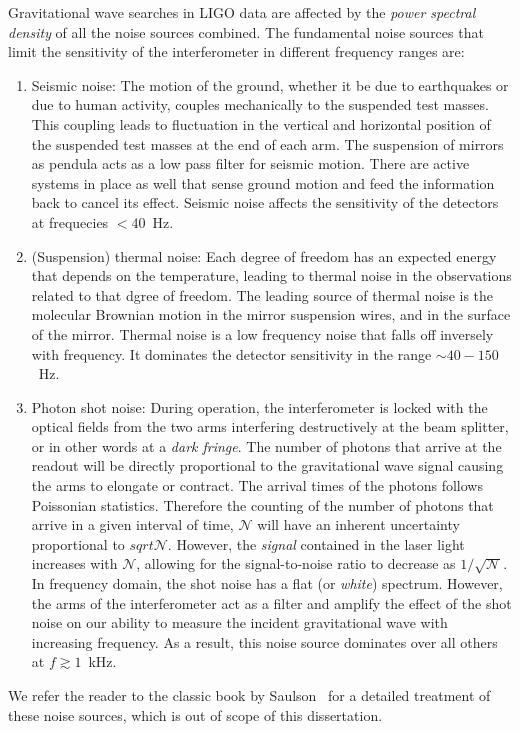 Gravitational wave searches in LIGO data are affected by the {\it power
spectral density} of all the noise sources combined. The fundamental noise 
sources that limit the sensitivity of the interferometer in different frequency
ranges are:
% 
\begin{enumerate}
 \item Seismic noise:
 The motion of the ground, whether it be due to earthquakes or due to human 
 activity, couples mechanically to the suspended test masses. This coupling
 leads to fluctuation in the vertical and horizontal position of the suspended
 test masses at the end of each arm. The suspension of mirrors as pendula acts 
 as a low pass filter for seismic motion. There are active systems in place as
 well that sense ground motion and feed the information back to cancel its
 effect. Seismic noise affects the sensitivity of the detectors at frequecies
 $< 40$~Hz.
 \item (Suspension) thermal noise:
 Each degree of freedom has an expected energy that depends on the temperature,
 leading to thermal noise in the observations related to that dgree of freedom.
 The leading source of thermal noise is the molecular Brownian motion in the
 mirror suspension wires, and in the surface of the mirror. Thermal noise is 
 a low frequency noise that falls off inversely with frequency. It dominates
 the detector sensitivity in the range $\sim 40-150$~Hz.
 \item Photon shot noise:
 During operation, the interferometer is locked 
 with the optical fields from the two arms interfering destructively at the
 beam splitter, or in other words at a {\it dark fringe}. The number of photons
 that arrive at the readout will be directly proportional to the gravitational
 wave signal causing the arms to elongate or contract. The arrival times of the
 photons follows Poissonian statistics. Therefore the counting of the number of
 photons that arrive in a given interval of time, $\mathcal{N}$ will have an 
 inherent uncertainty proportional to $sqrt{\mathcal{N}}$. However, the {\it signal}
 contained in the laser light increases with $\mathcal{N}$, allowing for the 
 signal-to-noise ratio to decrease as $1/\sqrt{\mathcal{N}}$.
 In frequency domain, the shot noise has a flat (or {\it white}) spectrum. 
 However, the arms of the interferometer act as a filter and amplify the effect
 of the shot noise on our ability to measure the incident gravitational wave
 with increasing frequency. As a result, this noise source dominates over all
 others at $f\gtrsim 1$~kHz.
\end{enumerate}
% 
We refer the reader to the classic book by Saulson~\cite{Saulson:1995zi} for a
detailed treatment of these noise sources, which is out of scope of this 
dissertation. 

